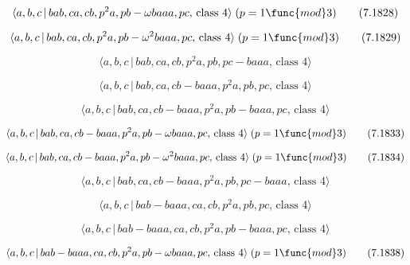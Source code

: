 \documentclass[10pt]{article}
\begin{document}
\begin{equation}
\langle a,b,c\,|\,bab,ca,cb,p^{2}a,pb-\omega baaa,pc,\,\text{class }4\rangle
\;(p=1\func{mod}3)  \tag{7.1828}
\end{equation}

\begin{equation}
\langle a,b,c\,|\,bab,ca,cb,p^{2}a,pb-\omega ^{2}baaa,pc,\,\text{class }%
4\rangle \;(p=1\func{mod}3)  \tag{7.1829}
\end{equation}

\begin{equation}
\langle a,b,c\,|\,bab,ca,cb,p^2a,pb,pc-baaa,\,\text{class }4\rangle 
\tag{7.1830}
\end{equation}

\begin{equation}
\langle a,b,c\,|\,bab,ca,cb-baaa,p^2a,pb,pc,\,\text{class }4\rangle 
\tag{7.1831}
\end{equation}

\begin{equation}
\langle a,b,c\,|\,bab,ca,cb-baaa,p^2a,pb-baaa,pc,\,\text{class }4\rangle 
\tag{7.1832}
\end{equation}

\begin{equation}
\langle a,b,c\,|\,bab,ca,cb-baaa,p^{2}a,pb-\omega baaa,pc,\,\text{class }%
4\rangle \;(p=1\func{mod}3)  \tag{7.1833}
\end{equation}

\begin{equation}
\langle a,b,c\,|\,bab,ca,cb-baaa,p^{2}a,pb-\omega ^{2}baaa,pc,\,\text{class }%
4\rangle \;(p=1\func{mod}3)  \tag{7.1834}
\end{equation}

\begin{equation}
\langle a,b,c\,|\,bab,ca,cb-baaa,p^2a,pb,pc-baaa,\,\text{class }4\rangle 
\tag{7.1835}
\end{equation}

\begin{equation}
\langle a,b,c\,|\,bab-baaa,ca,cb,p^2a,pb,pc,\,\text{class }4\rangle 
\tag{7.1836}
\end{equation}

\begin{equation}
\langle a,b,c\,|\,bab-baaa,ca,cb,p^2a,pb-baaa,pc,\,\text{class }4\rangle 
\tag{7.1837}
\end{equation}

\begin{equation}
\langle a,b,c\,|\,bab-baaa,ca,cb,p^{2}a,pb-\omega baaa,pc,\,\text{class }%
4\rangle \;(p=1\func{mod}3)  \tag{7.1838}
\end{equation}
\end{document}
